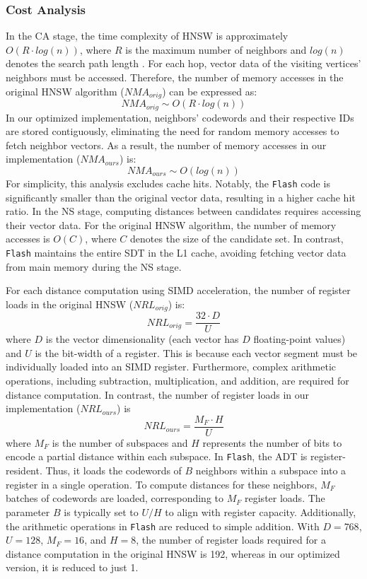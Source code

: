 \subsubsection{\textbf{Cost Analysis}}
\label{subsubsec: cost analysis}
In the CA stage, the time complexity of HNSW is approximately $O(R\cdot log(n))$, where $R$ is the maximum number of neighbors and $log(n)$ denotes the search path length \cite{graph_survey_vldb2021,HVS}. For each hop, vector data of the visiting vertices' neighbors must be accessed. Therefore, the number of memory accesses in the original HNSW algorithm ($NMA_{orig}$) can be expressed as:
\begin{equation}
    NMA_{orig} \sim O(R\cdot log(n))
\end{equation}
In our optimized implementation, neighbors' codewords and their respective IDs are stored contiguously, eliminating the need for random memory accesses to fetch neighbor vectors. As a result, the number of memory accesses in our implementation ($NMA_{ours}$) is:
\begin{equation}
    NMA_{ours} \sim O(log(n))
\end{equation}
For simplicity, this analysis excludes cache hits. Notably, the \texttt{Flash} code is significantly smaller than the original vector data, resulting in a higher cache hit ratio.
In the NS stage, computing distances between candidates requires accessing their vector data. For the original HNSW algorithm, the number of memory accesses is $O(C)$, where $C$ denotes the size of the candidate set. In contrast, \texttt{Flash} maintains the entire SDT in the L1 cache, avoiding fetching vector data from main memory during the NS stage.

For each distance computation using SIMD acceleration, the number of register loads in the original HNSW ($NRL_{orig}$) is:
\begin{equation}
    NRL_{orig} = \frac{32\cdot D}{U}
\end{equation}
where $D$ is the vector dimensionality (each vector has $D$ floating-point values) and $U$ is the bit-width of a register. This is because each vector segment must be individually loaded into an SIMD register. Furthermore, complex arithmetic operations, including subtraction, multiplication, and addition, are required for distance computation. In contrast, the number of register loads in our implementation ($NRL_{ours}$) is
\begin{equation}
    NRL_{ours} = \frac{M_{F}\cdot H}{U}
\end{equation}
where $M_F$ is the number of subspaces and $H$ represents the number of bits to encode a partial distance within each subspace. In \texttt{Flash}, the ADT is register-resident. Thus, it loads the codewords of $B$ neighbors within a subspace into a register in a single operation. To compute distances for these neighbors, $M_F$ batches of codewords are loaded, corresponding to $M_F$ register loads. The parameter $B$ is typically set to $U/H$ to align with register capacity. Additionally, the arithmetic operations in \texttt{Flash} are reduced to simple addition. With $D = 768$, $U = 128$, $M_F = 16$, and $H = 8$, the number of register loads required for a distance computation in the original HNSW is 192, whereas in our optimized version, it is reduced to just 1.